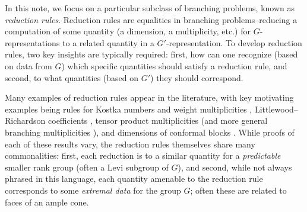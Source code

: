 \documentclass[12pt,reqno]{amsart}
\newtheorem{proposition}[theorem]{Proposition}
\theoremstyle{definition}
\begin{document}
In this note, we focus on a particular subclass of branching problems, known as \textit{reduction rules}. Reduction rules are equalities in branching problems--reducing a computation of some quantity (a dimension, a multiplicity, etc.) for $G$-representations to a related quantity in a $G'$-representation. To develop reduction rules, two key insights are typically required: first, how can one recognize (based on data from $G$) which specific quantities should satisfy a reduction rule, and second, to what quantities (based on $G'$) they should correspond. 

Many examples of reduction rules appear in the literature, with key motivating examples being rules for Kostka numbers and weight multiplicities \cite{BZ}, Littlewood--Richardson coefficients \cite{DW, KTT1}, tensor product multiplicities \cite{Roth} (and more general branching multiplicities \cite{Ress2}), and dimensions of conformal blocks \cite{Schu}. While proofs of each of these results vary, the reduction rules themselves share many commonalities: first, each reduction is to a similar quantity for a \textit{predictable} smaller rank group (often a Levi subgroup of $G$), and second, while not always phrased in this language, each quantity amenable to the reduction rule corresponds to some \textit{extremal data} for the group $G$; often these are related to faces of an ample cone. 




%
%
\end{document}
